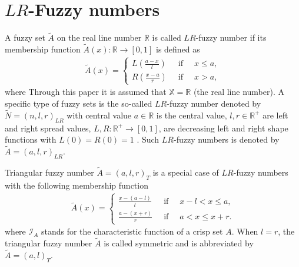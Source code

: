 \documentclass{IJFS}
\begin{document}
\appendix
\section{$LR$-Fuzzy numbers}
A fuzzy set $\widetilde{A}$ on the  real line number   $\mathbb{R}$ is called $LR$-fuzzy number if its membership function $\widetilde{A}(x):\mathbb{R}\rightarrow[0,1]$ is defined as
\begin{eqnarray*}
    \widetilde{A}(x)   =   \left\{\begin{array}{lcl}
                L(\frac{a-x}{l}) &\  \textrm{\ if\ }\  & x\leq a,\\
                R(\frac{x-a}{r}) &\  \textrm{\ if\ }\  & x> a,
                \end{array}
          \right.
\end{eqnarray*}
where
Through this paper it is assumed that  $\mathbb{X}=\mathbb{R}$ (the real line number).
A specific type of fuzzy sets is the so-called $LR$-fuzzy number denoted by $\widetilde{N} = (n, l, r)_{LR}$ with central value
$a\in\mathbb{R}$ is the central value,
$l,r\in\mathbb{R}^+$ are left and right spread values,
$L,R:\mathbb{R}^+\rightarrow[0,1]$, are decreasing left and right shape functions  with $L(0) = R(0) = 1$  \cite{Kli02}.
Such $LR$-fuzzy numbers is denoted by $\widetilde{A} = (a, l, r)_{LR}$.

Triangular fuzzy number  $\widetilde{A} = (a, l, r)_T$ is a special case of $LR$-fuzzy numbers  with the following  membership function
\begin{eqnarray*}
    \widetilde{A}(x)   =   \left\{\begin{array}{lcl}
                \frac{x-(a-l)}{l}   &\  \textrm{\ if\ }\  & x-l<x\leq a,\\
                \frac{a-(x+r)}{r}   &\  \textrm{\ if\ }\  & a<x\leq x+r.
                \end{array}
          \right.
\end{eqnarray*}
where $\mathcal{I}_{A}$ stands for the characteristic function of a crisp set $A$.
When $l=r$, the triangular fuzzy number  $\widetilde{A}$  is called symmetric and is abbreviated by $\widetilde{A} = (a,l)_{T}$.
\end{document}
